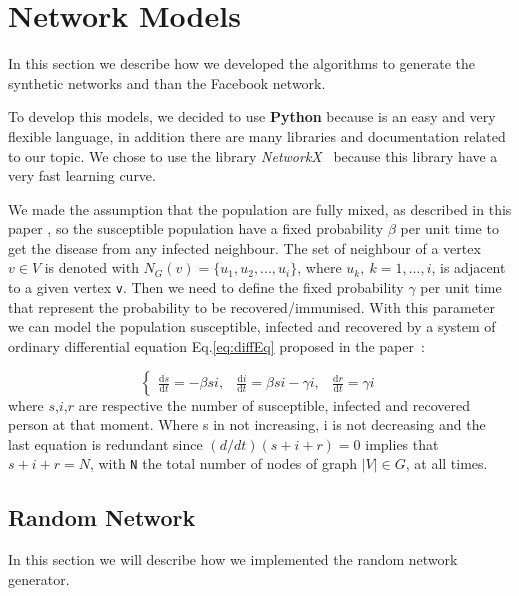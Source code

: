 
\section{Network Models}
    In this section we describe how we developed the algorithms to generate the synthetic networks and than the Facebook network.
    
    To develop this models, we decided to use \textbf{Python} because is an easy and very flexible language, in addition there are many libraries and documentation related to our topic.
    We chose to use the library \textit{NetworkX}~\cite{NetworkX} because this library have a very fast learning curve.
    
    We made the assumption that the population are fully mixed, as described in this paper \cite{witten2007simulations}, so the susceptible population have a fixed probability $\beta$ per unit time to get the disease from any infected neighbour. The set of neighbour of a vertex $v \in V$ is denoted with $N_G(v) = \{u_1, u_2, ..., u_i \}$, where $u_k,~k=1,...,i$, is adjacent to a given vertex \verb|v|.
    Then we need to define the fixed probability $\gamma$ per unit time that represent the probability to be recovered/immunised.
    With this parameter we can model the population susceptible, infected and recovered by a system of ordinary differential equation Eq.\ref{eq:diffEq} proposed in the paper~\cite{witten2007simulations}:
    
    \begin{equation}\label{eq:diffEq}
      \left\{\begin{matrix}
        \frac{\mathrm{d} s}{\mathrm{d} t} = -\beta si, & 
        \frac{\mathrm{d} i}{\mathrm{d} t} = \beta si - \gamma i,& 
        \frac{\mathrm{d} r}{\mathrm{d} t} = \gamma i
    \end{matrix}\right.
    \end{equation}
    where $s$,$i$,$r$ are respective the number of susceptible, infected and recovered person at that moment.
    Where s in not increasing, i is not decreasing and the last equation is redundant since $(d/dt)(s + i + r) = 0$ implies that $s + i + r = N$, with \verb|N| the total number of nodes of graph $|V| \in G$, at all times.
    
    \subsection{Random Network}
        In this section we will describe how we implemented the random network generator.
        

